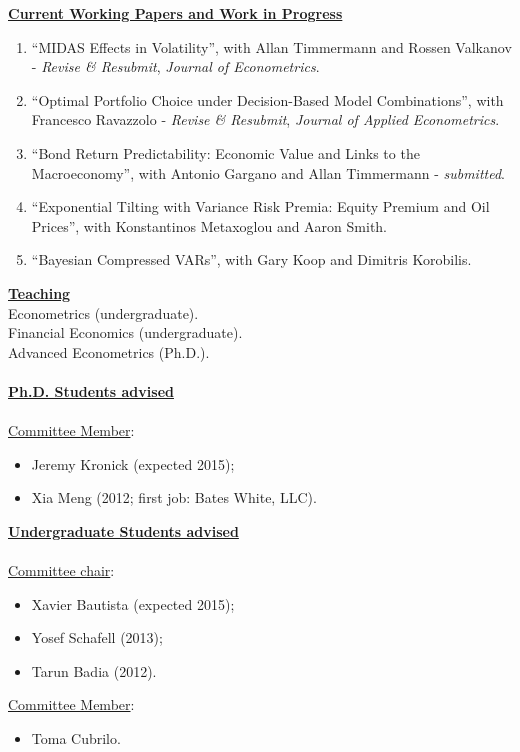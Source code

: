 \documentclass[12pt]{article}
\begin{document}
\underline{\textbf{Current Working Papers and Work in Progress}}
\begin{enumerate}
	\setcounter{enumi}{\theenumTemp}
	\item ``MIDAS Effects in Volatility'', with Allan Timmermann and Rossen Valkanov - \textit{Revise \& Resubmit}, \emph{Journal of Econometrics}.
	\item ``Optimal Portfolio Choice under Decision-Based Model Combinations'', with Francesco Ravazzolo - \textit{Revise \& Resubmit}, \emph{Journal of Applied Econometrics}.
	\item ``Bond Return Predictability: Economic Value and Links to the Macroeconomy'', with Antonio Gargano and Allan Timmermann - \textit{submitted}.
	\item ``Exponential Tilting with Variance Risk Premia: Equity Premium and Oil Prices'', with Konstantinos Metaxoglou  and Aaron Smith.
	\item ``Bayesian Compressed VARs'', with Gary Koop and Dimitris Korobilis.
	
\end{enumerate}

\underline{\textbf{Teaching}}\\
Econometrics (undergraduate).\\
Financial Economics (undergraduate). \\
Advanced Econometrics (Ph.D.). \\ \\
\underline{\textbf{Ph.D. Students advised}} \\ \\
\underline{Committee Member}: 
\begin{itemize}
	\item Jeremy Kronick (expected 2015);
	\item Xia Meng (2012; first job: Bates White, LLC). 
\end{itemize}
\underline{\textbf{Undergraduate Students advised}} \\ \\
\underline{Committee chair}: 
\begin{itemize}
	\item Xavier Bautista (expected 2015);
	\item Yosef Schafell (2013);
	\item Tarun Badia (2012). 
\end{itemize}
\underline{Committee Member}: 
\begin{itemize}
	\item Toma Cubrilo.
\end{itemize}
\end{document}

